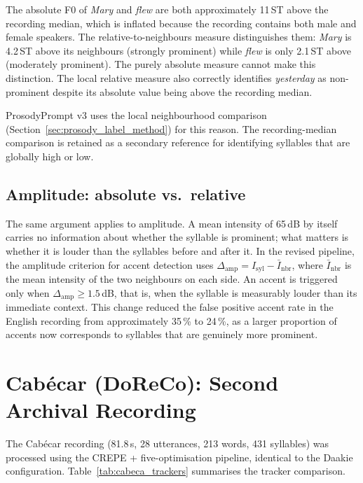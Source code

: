 The absolute F0 of \textit{Mary} and \textit{flew} are both approximately 11\,ST
above the recording median, which is inflated because the recording contains both
male and female speakers. The relative-to-neighbours measure distinguishes them:
\textit{Mary} is 4.2\,ST above its neighbours (strongly prominent) while
\textit{flew} is only 2.1\,ST above (moderately prominent). The purely absolute
measure cannot make this distinction. The local relative measure also correctly
identifies \textit{yesterday} as non-prominent despite its absolute value being
above the recording median.

ProsodyPrompt v3 uses the local neighbourhood comparison (Section~\ref{sec:prosody_label_method})
for this reason. The recording-median comparison is retained as a secondary
reference for identifying syllables that are globally high or low.

\subsection{Amplitude: absolute vs.\ relative}

The same argument applies to amplitude. A mean intensity of 65\,dB by itself
carries no information about whether the syllable is prominent; what matters is
whether it is louder than the syllables before and after it. In the revised
pipeline, the amplitude criterion for accent detection uses
$\Delta_{\mathrm{amp}} = I_{\mathrm{syl}} - \bar{I}_{\mathrm{nbr}}$, where
$\bar{I}_{\mathrm{nbr}}$ is the mean intensity of the two neighbours on each side.
An accent is triggered only when $\Delta_{\mathrm{amp}} \geq 1.5$\,dB, that is,
when the syllable is measurably louder than its immediate context. This change
reduced the false positive accent rate in the English recording from approximately
35\,\% to 24\,\%, as a larger proportion of accents now corresponds to syllables
that are genuinely more prominent.

\section{Cabécar (DoReCo): Second Archival Recording}
\label{sec:cabeca_results}

The Cabécar recording (81.8\,s, 28 utterances, 213 words, 431 syllables) was
processed using the CREPE + five-optimisation pipeline, identical to the Daakie
configuration. Table~\ref{tab:cabeca_trackers} summarises the tracker comparison.

